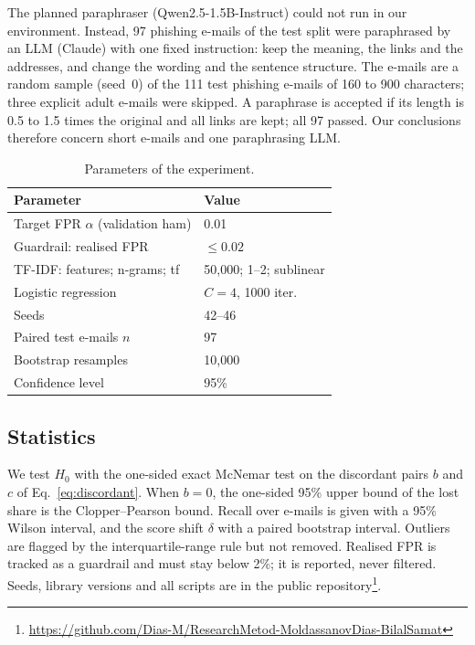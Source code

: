 The planned paraphraser (Qwen2.5-1.5B-Instruct) could not run in our environment. Instead, 97 phishing e-mails of the test split were paraphrased by an LLM (Claude) with one fixed instruction: keep the meaning, the links and the addresses, and change the wording and the sentence structure. The e-mails are a random sample (seed~0) of the 111 test phishing e-mails of 160 to 900 characters; three explicit adult e-mails were skipped. A paraphrase is accepted if its length is 0.5 to 1.5 times the original and all links are kept; all 97 passed. Our conclusions therefore concern short e-mails and one paraphrasing LLM.

\begin{table}[t]
\caption{Parameters of the experiment.}
\label{tab:params}
\centering
\small
\begin{tabular}{@{}p{}p{}@{}}
\toprule
Parameter & Value \\
\midrule
Target FPR $\alpha$ (validation ham) & 0.01 \\
Guardrail: realised FPR & $\le 0.02$ \\
TF-IDF: features; n-grams; tf & 50,000; 1--2; sublinear \\
Logistic regression & $C=4$, 1000 iter. \\
Seeds & 42--46 \\
Paired test e-mails $n$ & 97 \\
Bootstrap resamples & 10,000 \\
Confidence level & 95\% \\
\bottomrule
\end{tabular}
\end{table}

\subsection{Statistics}
\label{sec:method:stats}
We test $H_0$ with the one-sided exact McNemar test on the discordant pairs $b$ and $c$ of Eq.~\eqref{eq:discordant}. When $b=0$, the one-sided 95\% upper bound of the lost share is the Clopper--Pearson bound. Recall over e-mails is given with a 95\% Wilson interval, and the score shift $\delta$ with a paired bootstrap interval. Outliers are flagged by the interquartile-range rule but not removed. Realised FPR is tracked as a guardrail and must stay below 2\%; it is reported, never filtered. Seeds, library versions and all scripts are in the public repository\footnote{\url{https://github.com/Dias-M/ResearchMetod-MoldassanovDias-BilalSamat}}.
